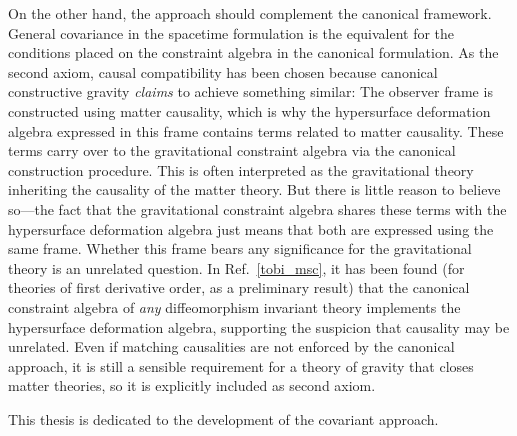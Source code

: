 On the other hand, the approach should complement the canonical framework. General covariance in the spacetime formulation is the equivalent for the conditions placed on the constraint algebra in the canonical formulation. As the second axiom, causal compatibility has been chosen because canonical constructive gravity \emph{claims} to achieve something similar: The observer frame is constructed using matter causality, which is why the hypersurface deformation algebra expressed in this frame contains terms related to matter causality. These terms carry over to the gravitational constraint algebra via the canonical construction procedure. This is often interpreted as the gravitational theory inheriting the causality of the matter theory. But there is little reason to believe so---the fact that the gravitational constraint algebra shares these terms with the hypersurface deformation algebra just means that both are expressed using the same frame. Whether this frame bears any significance for the gravitational theory is an unrelated question. In Ref.~\ref{tobi_msc}, it has been found (for theories of first derivative order, as a preliminary result) that the canonical constraint algebra of \emph{any} diffeomorphism invariant theory implements the hypersurface deformation algebra, supporting the suspicion that causality may be unrelated. Even if matching causalities are not enforced by the canonical approach, it is still a sensible requirement for a theory of gravity that closes matter theories, so it is explicitly included as second axiom.

This thesis is dedicated to the development of the covariant approach.

